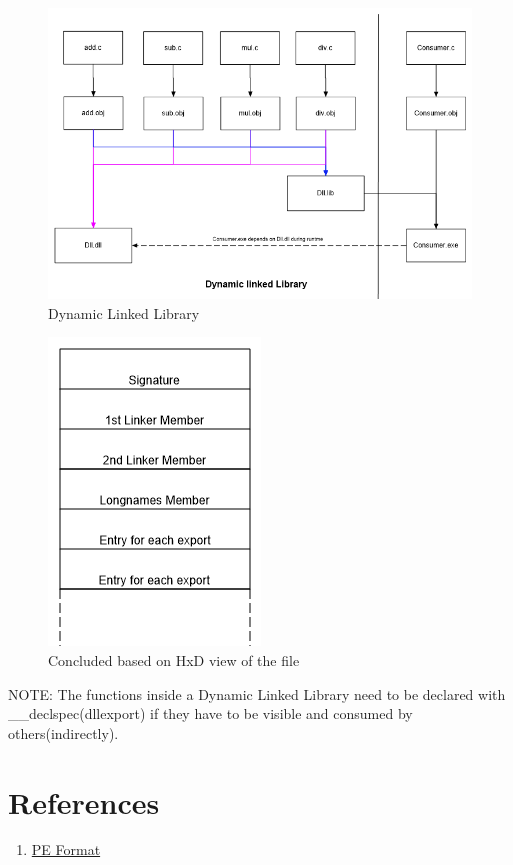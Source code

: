 \documentclass{article}
\begin{document}
\begin{figure}[H]
\centering
\includegraphics[width=\textwidth]{3.Dll.png}
\caption{Dynamic Linked Library}
\end{figure}
\begin{figure}[H]
\centering
\includegraphics{4.StructureDll.png}
\caption{Concluded based on HxD view of the file}
\end{figure}

NOTE: The functions inside a Dynamic Linked Library need to be declared
with \_\_declspec(dllexport) if they have to be visible and consumed
by others(indirectly).

\section{References}
\begin{enumerate}[noitemsep]
\item \href{https://docs.microsoft.com/en-us/windows/desktop/debug/pe-format}{PE Format}
\end{enumerate}
\end{document}
